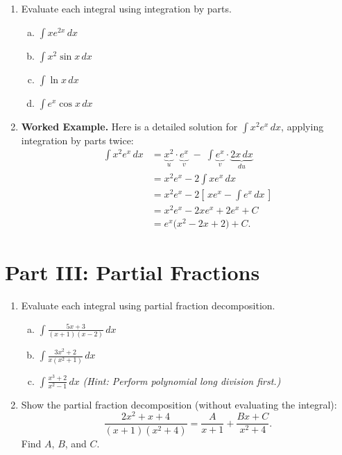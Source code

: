 \documentclass[11pt]{article}
\begin{document}
\begin{enumerate}[resume]
\item Evaluate each integral using integration by parts.
\begin{enumerate}[(a)]
  \item $\displaystyle \int x e^{2x} \, dx$

  \item $\displaystyle \int x^2 \sin x \, dx$

  \item $\displaystyle \int \ln x \, dx$

  \item $\displaystyle \int e^x \cos x \, dx$
\end{enumerate}

\item \textbf{Worked Example.} Here is a detailed solution for $\displaystyle \int x^2 e^x \, dx$, applying integration by parts twice:
\begin{align*}
  \int x^2 e^x \, dx
    &= \underbrace{x^2}_{u} \cdot \underbrace{e^x}_{v}
       \;-\; \int \underbrace{e^x}_{v} \cdot \underbrace{2x \, dx}_{du} \\[6pt]
    &= x^2 e^x - 2\!\int x e^x \, dx \\[6pt]
    &= x^2 e^x - 2\!\left[\, x e^x - \int e^x \, dx \,\right] \\[6pt]
    &= x^2 e^x - 2x e^x + 2e^x + C \\[6pt]
    &= e^x\bigl(x^2 - 2x + 2\bigr) + C.
\end{align*}
\end{enumerate}

\section*{Part III: Partial Fractions}

\begin{enumerate}[resume]
\item Evaluate each integral using partial fraction decomposition.
\begin{enumerate}[(a)]
  \item $\displaystyle \int \frac{5x + 3}{(x+1)(x-2)} \, dx$

  \item $\displaystyle \int \frac{3x^2 + 2}{x(x^2 + 1)} \, dx$

  \item $\displaystyle \int \frac{x^3 + 2}{x^2 - 1} \, dx$ \quad \emph{(Hint: Perform polynomial long division first.)}
\end{enumerate}

\item Show the partial fraction decomposition (without evaluating the integral):
\[
  \frac{2x^2 + x + 4}{(x+1)(x^2 + 4)} = \frac{A}{x+1} + \frac{Bx + C}{x^2 + 4}.
\]
Find $A$, $B$, and $C$.
\end{enumerate}
\end{document}
